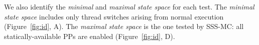 We also identify the {\em minimal} and {\em maximal state space} for each test.
The {\em minimal state space} includes only thread switches arising from normal execution (Figure~\ref{fig:id}, A).
The {\em maximal state space} is the one tested by SSS-MC: all statically-available PPs are enabled (Figure~\ref{fig:id}, D).
